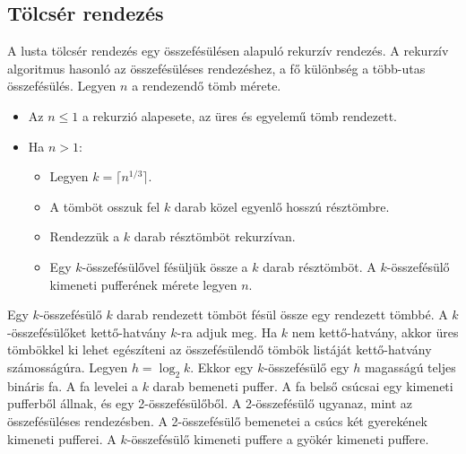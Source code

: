 \documentclass[12pt]{report}
\begin{document}
\subsection{Tölcsér rendezés}

A lusta tölcsér rendezés\cite{brodal-distribution-sweep}
egy összefésülésen alapuló rekurzív rendezés.
A rekurzív algoritmus hasonló az összefésüléses rendezéshez,
a fő különbség a több-utas összefésülés.
Legyen $n$ a rendezendő tömb mérete.
\begin{itemize}
\item Az $n \le 1$ a rekurzió alapesete, az üres és egyelemű tömb rendezett.
\item Ha $n > 1$:
\begin{itemize}
\item Legyen $k = \lceil n^{1/3} \rceil$.
\item A tömböt osszuk fel $k$ darab közel egyenlő hosszú résztömbre.
\item Rendezzük a $k$ darab résztömböt rekurzívan.
\item Egy $k$-összefésülővel fésüljük össze a $k$ darab résztömböt.
A $k$-összefésülő kimeneti pufferének mérete legyen $n$.
\end{itemize}
\end{itemize}

Egy $k$-összefésülő $k$ darab rendezett tömböt fésül össze egy rendezett tömbbé.
A $k$-összefésülőket kettő-hatvány $k$-ra adjuk meg.
Ha $k$ nem kettő-hatvány, akkor üres tömbökkel ki lehet egészíteni az összefésülendő
tömbök listáját kettő-hatvány számosságúra.
Legyen $h = \log_2{k}$.
Ekkor egy $k$-összefésülő egy $h$ magasságú teljes bináris fa.
A fa levelei a $k$ darab bemeneti puffer.
A fa belső csúcsai egy kimeneti pufferből állnak,
és egy 2-összefésülőből.
A 2-összefésülő ugyanaz, mint az összefésüléses rendezésben.
A 2-összefésülő bemenetei a csúcs két gyerekének kimeneti pufferei.
A $k$-összefésülő kimeneti puffere a gyökér kimeneti puffere.
\end{document}

